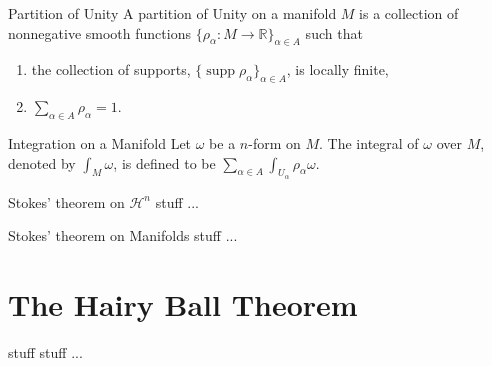 \documentclass[9pt]{beamer}
\DeclareMathOperator{\supp}{supp}
\begin{document}
\begin{frame}
    \begin{block}{Partition of Unity}
        A partition of Unity on a manifold $M$ is a collection of nonnegative smooth functions $\{\rho_\alpha:M \rightarrow \mathbb{R}\}_{\alpha\in A}$ such that \begin{enumerate}[i]
            \item the collection of supports, $\{\supp\rho_\alpha\}_{\alpha\in A}$, is locally finite,
            \item $\sum_{\alpha\in A} \rho_\alpha = 1.$
        \end{enumerate}
    \end{block}

    \begin{block}{Integration on a Manifold}
        Let $\omega$ be a $n$-form on $M$. The integral of $\omega$ over $M$, denoted by $\int_M \omega$, is defined to be $\sum_{\alpha\in A}\int_{U_\alpha}\rho_\alpha\omega$.
    \end{block}
\end{frame}

\begin{frame}
    \begin{block}{Stokes' theorem on $\mathcal{H}^n$}
        stuff ...
    \end{block}
\end{frame}

\begin{frame}
    \begin{block}{Stokes' theorem on Manifolds}
        stuff ...
    \end{block}
\end{frame}

\section{The Hairy Ball Theorem}

\begin{frame}
    \begin{block}{stuff}
        stuff ...
    \end{block}
\end{frame}
\end{document}
